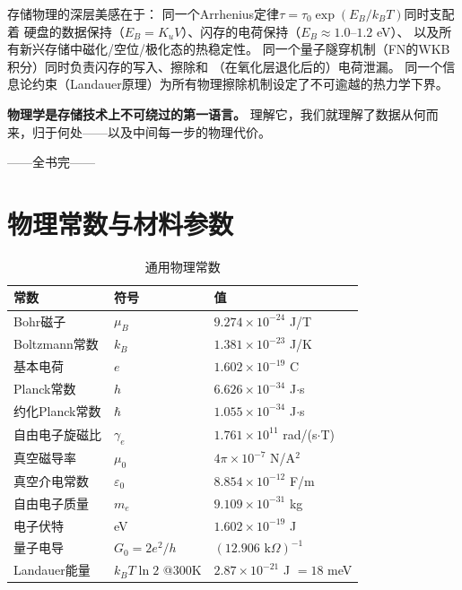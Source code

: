 \documentclass[11pt,a4paper,openany]{book}
\theoremstyle{definition}
\theoremstyle{plain}
\theoremstyle{remark}
\begin{document}
存储物理的深层美感在于：
同一个Arrhenius定律$\tau = \tau_0\exp(E_B/k_B T)$同时支配着
硬盘的数据保持（$E_B = K_u V$）、闪存的电荷保持（$E_B \approx 1.0$--$1.2$ eV）、
以及所有新兴存储中磁化/空位/极化态的热稳定性。
同一个量子隧穿机制（FN的WKB积分）同时负责闪存的写入、擦除和
（在氧化层退化后的）电荷泄漏。
同一个信息论约束（Landauer原理）为所有物理擦除机制设定了不可逾越的热力学下界。

\textbf{物理学是存储技术上不可绕过的第一语言。}
理解它，我们就理解了数据从何而来，归于何处——以及中间每一步的物理代价。

\vspace{1cm}
\begin{flushright}
——全书完——
\end{flushright}

\appendix
\chapter{物理常数与材料参数}

\begin{table}[H]
\centering
\caption{通用物理常数}
\begin{tabular}{@{}lll@{}}
\toprule
常数 & 符号 & 值 \\
\midrule
Bohr磁子 & $\mu_B$ & $9.274 \times 10^{-24}$ J/T \\
Boltzmann常数 & $k_B$ & $1.381 \times 10^{-23}$ J/K \\
基本电荷 & $e$ & $1.602 \times 10^{-19}$ C \\
Planck常数 & $h$ & $6.626 \times 10^{-34}$ J$\cdot$s \\
约化Planck常数 & $\hbar$ & $1.055 \times 10^{-34}$ J$\cdot$s \\
自由电子旋磁比 & $\gamma_e$ & $1.761 \times 10^{11}$ rad/(s$\cdot$T) \\
真空磁导率 & $\mu_0$ & $4\pi \times 10^{-7}$ N/A$^2$ \\
真空介电常数 & $\varepsilon_0$ & $8.854 \times 10^{-12}$ F/m \\
自由电子质量 & $m_e$ & $9.109 \times 10^{-31}$ kg \\
电子伏特 & eV & $1.602 \times 10^{-19}$ J \\
量子电导 & $G_0 = 2e^2/h$ & $(12.906\text{ k}\Omega)^{-1}$ \\
Landauer能量 & $k_B T\ln 2$ @300K & $2.87 \times 10^{-21}$ J $= 18$ meV \\
\bottomrule
\end{tabular}
\end{table}
\end{document}
